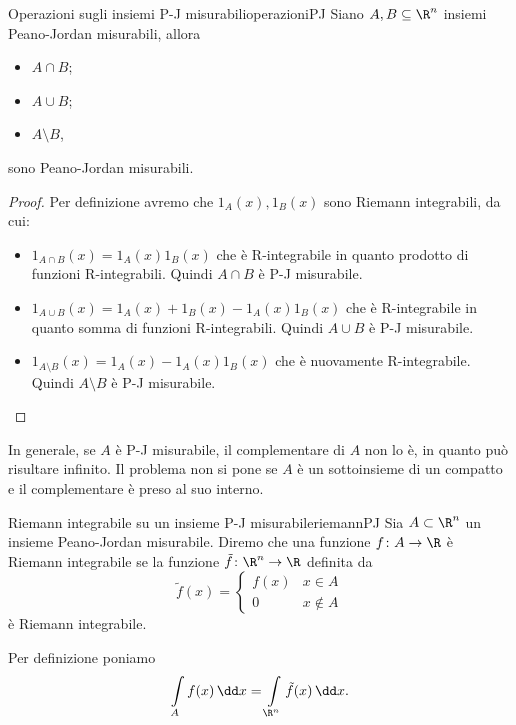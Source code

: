 \begin{teor}{Operazioni sugli insiemi P-J misurabili}{operazioniPJ}
	Siano \(A,B \subseteq \R^n\) insiemi Peano-Jordan misurabili, allora
	\begin{itemize}
		\item \(A \cap B\);
		\item \(A \cup B\);
		\item \(A \setminus B\),
	\end{itemize}
	sono Peano-Jordan misurabili.
\end{teor}

\begin{proof}
	Per definizione avremo che \(1_A(x),1_B(x)\) sono Riemann integrabili, da cui:
	\begin{itemize}
		\item \(1_{A \cap B}(x) = 1_A(x) 1_B(x)\) che è R-integrabile in quanto prodotto di funzioni R-integrabili.
		      Quindi \(A \cap B\) è P-J misurabile.
		\item \(1_{A \cup B}(x) = 1_A(x) + 1_B(x) - 1_A(x) 1_B(x)\) che è R-integrabile in quanto somma di funzioni R-integrabili.
		      Quindi \(A \cup B\) è P-J misurabile.
		\item \(1_{A \setminus B}(x) = 1_A(x) - 1_A(x) 1_B(x)\) che è nuovamente R-integrabile.
		      Quindi \(A \setminus B\) è P-J misurabile.\qedhere
	\end{itemize}
\end{proof}

\begin{oss}
	In generale, se \(A\) è P-J misurabile, il complementare di \(A\) non lo è, in quanto può risultare infinito.
	Il problema non si pone se \(A\) è un sottoinsieme di un compatto e il complementare è preso al suo interno.
\end{oss}

\begin{defn}{Riemann integrabile su un insieme P-J misurabile}{riemannPJ}
	Sia \(A\subset \R^n\) un insieme Peano-Jordan misurabile.
	Diremo che una funzione \(f\colon A \to \R\) è Riemann integrabile se la funzione \(\tilde{f}\colon\R^n \to \R\) definita da
	\[
		\tilde{f}(x) = 	\begin{cases}
			f(x) & x\in A    \\
			0    & x\notin A
		\end{cases}
	\]
	è Riemann integrabile.
\end{defn}

\begin{notz}
	Per definizione poniamo
	\[
		\int\limits_A f(x)\,\dd x = \int\limits_{\R^n} \tilde{f}(x)\,\dd x.
	\]
\end{notz}

